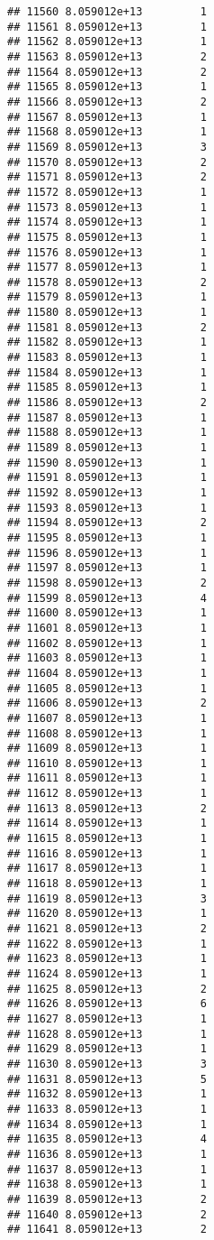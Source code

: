 \documentclass[
]{article}
\begin{document}
\begin{verbatim}
## 11560 8.059012e+13         1
## 11561 8.059012e+13         1
## 11562 8.059012e+13         1
## 11563 8.059012e+13         2
## 11564 8.059012e+13         2
## 11565 8.059012e+13         1
## 11566 8.059012e+13         2
## 11567 8.059012e+13         1
## 11568 8.059012e+13         1
## 11569 8.059012e+13         3
## 11570 8.059012e+13         2
## 11571 8.059012e+13         2
## 11572 8.059012e+13         1
## 11573 8.059012e+13         1
## 11574 8.059012e+13         1
## 11575 8.059012e+13         1
## 11576 8.059012e+13         1
## 11577 8.059012e+13         1
## 11578 8.059012e+13         2
## 11579 8.059012e+13         1
## 11580 8.059012e+13         1
## 11581 8.059012e+13         2
## 11582 8.059012e+13         1
## 11583 8.059012e+13         1
## 11584 8.059012e+13         1
## 11585 8.059012e+13         1
## 11586 8.059012e+13         2
## 11587 8.059012e+13         1
## 11588 8.059012e+13         1
## 11589 8.059012e+13         1
## 11590 8.059012e+13         1
## 11591 8.059012e+13         1
## 11592 8.059012e+13         1
## 11593 8.059012e+13         1
## 11594 8.059012e+13         2
## 11595 8.059012e+13         1
## 11596 8.059012e+13         1
## 11597 8.059012e+13         1
## 11598 8.059012e+13         2
## 11599 8.059012e+13         4
## 11600 8.059012e+13         1
## 11601 8.059012e+13         1
## 11602 8.059012e+13         1
## 11603 8.059012e+13         1
## 11604 8.059012e+13         1
## 11605 8.059012e+13         1
## 11606 8.059012e+13         2
## 11607 8.059012e+13         1
## 11608 8.059012e+13         1
## 11609 8.059012e+13         1
## 11610 8.059012e+13         1
## 11611 8.059012e+13         1
## 11612 8.059012e+13         1
## 11613 8.059012e+13         2
## 11614 8.059012e+13         1
## 11615 8.059012e+13         1
## 11616 8.059012e+13         1
## 11617 8.059012e+13         1
## 11618 8.059012e+13         1
## 11619 8.059012e+13         3
## 11620 8.059012e+13         1
## 11621 8.059012e+13         2
## 11622 8.059012e+13         1
## 11623 8.059012e+13         1
## 11624 8.059012e+13         1
## 11625 8.059012e+13         2
## 11626 8.059012e+13         6
## 11627 8.059012e+13         1
## 11628 8.059012e+13         1
## 11629 8.059012e+13         1
## 11630 8.059012e+13         3
## 11631 8.059012e+13         5
## 11632 8.059012e+13         1
## 11633 8.059012e+13         1
## 11634 8.059012e+13         1
## 11635 8.059012e+13         4
## 11636 8.059012e+13         1
## 11637 8.059012e+13         1
## 11638 8.059012e+13         1
## 11639 8.059012e+13         2
## 11640 8.059012e+13         2
## 11641 8.059012e+13         2

\end{verbatim}
\end{document}
